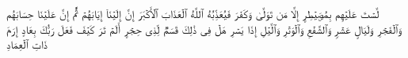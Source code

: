 \stopbuffer%
\startbuffer[\q:88:22]
لَّسۡتَ عَلَیۡهِم بِمُصَۣیۡطِرٍ%
\stopbuffer%
\startbuffer[\q:88:23]
إِلَّا مَن تَوَلَّىٰ وَكَفَرَ%
\stopbuffer%
\startbuffer[\q:88:24]
فَیُعَذِّبُهُ ٱللَّهُ ٱلۡعَذَابَ ٱلۡأَكۡبَرَ%
\stopbuffer%
\startbuffer[\q:88:25]
إِنَّ إِلَیۡنَاۤ إِیَابَهُمۡ%
\stopbuffer%
\startbuffer[\q:88:26]
ثُمَّ إِنَّ عَلَیۡنَا حِسَابَهُم%
\stopbuffer%
\startbuffer[\q:89:1]
وَٱلۡفَجۡرِ%
\stopbuffer%
\startbuffer[\q:89:2]
وَلَیَالٍ عَشۡرࣲ%
\stopbuffer%
\startbuffer[\q:89:3]
وَٱلشَّفۡعِ وَٱلۡوَتۡرِ%
\stopbuffer%
\startbuffer[\q:89:4]
وَٱلَّیۡلِ إِذَا یَسۡرِ%
\stopbuffer%
\startbuffer[\q:89:5]
هَلۡ فِی ذَٰلِكَ قَسَمࣱ لِّذِی حِجۡرٍ%
\stopbuffer%
\startbuffer[\q:89:6]
أَلَمۡ تَرَ كَیۡفَ فَعَلَ رَبُّكَ بِعَادٍ%
\stopbuffer%
\startbuffer[\q:89:7]
إِرَمَ ذَاتِ ٱلۡعِمَادِ%
\stopbuffer%
